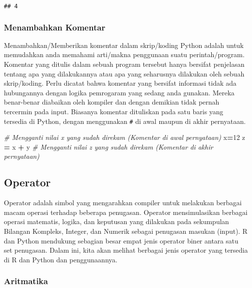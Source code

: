 \documentclass[
]{docs}
\newenvironment{Shaded}{\begin{snugshade}}{\end{snugshade}}
\newcommand{\CommentTok}[1]{\textcolor[rgb]{0.56,0.35,0.01}{\textit{#1}}}
\newcommand{\DecValTok}[1]{\textcolor[rgb]{0.00,0.00,0.81}{#1}}
\newcommand{\NormalTok}[1]{#1}
\newcommand{\OperatorTok}[1]{\textcolor[rgb]{0.81,0.36,0.00}{\textbf{#1}}}
\begin{document}
\begin{verbatim}
## 4
\end{verbatim}

\hypertarget{menambahkan-komentar}{%
\subsubsection{Menambahkan Komentar}\label{menambahkan-komentar}}

Menambahkan/Memberikan komentar dalam skrip/koding Python adalah untuk memudahkan anda memahami arti/makna penggunaan suatu perintah/program. Komentar yang ditulis dalam sebuah program tersebut hanya bersifat penjelasan tentang apa yang dilakukannya atau apa yang seharusnya dilakukan oleh sebuah skrip/koding. Perlu dicatat bahwa komentar yang bersifat informasi tidak ada hubungannya dengan logika pemrogaram yang sedang anda gunakan. Mereka benar-benar diabaikan oleh kompiler dan dengan demikian tidak pernah tercermin pada input. Biasanya komentar dituliskan pada satu baris yang tersedia di Python, dengan menggunakan \texttt{\#} di awal maupun di akhir pernyataan.

\begin{Shaded}
\begin{Highlighting}[]
\CommentTok{\# Mengganti nilai x yang sudah direkam (Komentar di awal pernyataan) }
\NormalTok{x}\OperatorTok{=}\DecValTok{12} 
\NormalTok{z }\OperatorTok{=}\NormalTok{ x }\OperatorTok{+}\NormalTok{ y   }\CommentTok{\# Mengganti nilai z yang sudah direkam (Komentar di akhir pernyataan) }
\end{Highlighting}
\end{Shaded}

\hypertarget{operator}{%
\subsection{Operator}\label{operator}}

Operator adalah simbol yang mengarahkan compiler untuk melakukan berbagai macam operasi terhadap beberapa penugasan. Operator mensimulasikan berbagai operasi matematis, logika, dan keputusan yang dilakukan pada sekumpulan Bilangan Kompleks, Integer, dan Numerik sebagai penugasan masukan (input). R dan Python mendukung sebagian besar empat jenis operator biner antara satu set penugasan. Dalam ini, kita akan melihat berbagai jenis operator yang tersedia di R dan Python dan penggunaannya.

\hypertarget{aritmatika}{%
\subsubsection{Aritmatika}\label{aritmatika}}
\end{document}
